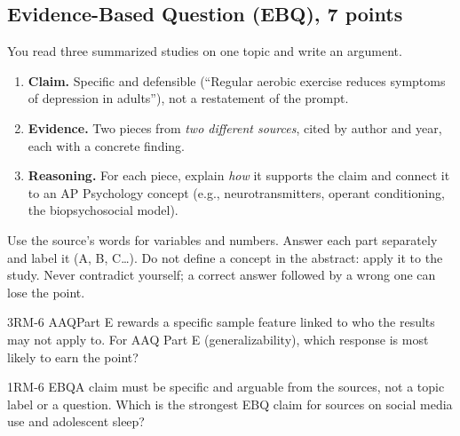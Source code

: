 \documentclass[11pt]{article}
\begin{document}
\subsection{Evidence-Based Question (EBQ), 7 points}
You read three summarized studies on one topic and write an argument.
\begin{enumerate}[label=\textbf{\arabic*.}]
\item \textbf{Claim.} Specific and defensible (``Regular aerobic exercise reduces symptoms of depression in adults''), not a restatement of the prompt.
\item \textbf{Evidence.} Two pieces from \emph{two different sources}, cited by author and year, each with a concrete finding.
\item \textbf{Reasoning.} For each piece, explain \emph{how} it supports the claim and connect it to an AP Psychology concept (e.g., neurotransmitters, operant conditioning, the biopsychosocial model).
\end{enumerate}

\begin{keyidea}
Use the source's words for variables and numbers. Answer each part separately and label it (A, B, C\dots). Do not define a concept in the abstract: apply it to the study. Never contradict yourself; a correct answer followed by a wrong one can lose the point.
\end{keyidea}

\begin{q}{3}{RM-6 AAQ}{Part E rewards a specific sample feature linked to who the results may not apply to.}
For AAQ Part E (generalizability), which response is most likely to earn the point?
\end{q}

\begin{q}{1}{RM-6 EBQ}{A claim must be specific and arguable from the sources, not a topic label or a question.}
Which is the strongest EBQ claim for sources on social media use and adolescent sleep?
\end{q}

\makekey
\end{document}
